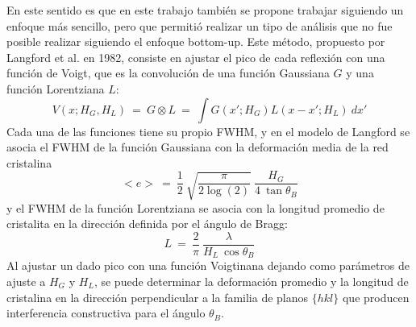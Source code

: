 En este sentido es que en este trabajo también se propone trabajar siguiendo un enfoque más sencillo, pero que permitió realizar un tipo de análisis que no fue posible realizar siguiendo el enfoque bottom-up.
Este método, propuesto por Langford et al. en 1982\cite{DeKeijser1982}, consiste en ajustar el pico de cada reflexión con una función de Voigt, que es la convolución de una función Gaussiana $G$ y una función Lorentziana $L$:
\begin{equation}
  V(x; H_{G}, H_{L}) \ = \ G \otimes L \ = \ \int G(x'; H_{G}) L(x - x'; H_{L}) \ dx'
  \label{eq:Voigt}
\end{equation}
\noindent
Cada una de las funciones tiene su propio FWHM, y en el modelo de Langford se asocia el FWHM de la función Gaussiana con la deformación media de la red cristalina
\begin{equation}
  <e> \ = \ \frac{1}{2} \ \sqrt{\frac{\pi}{2\log(2)}} \ \frac{H_{G}}{4 \ \tan{\theta_B}}
  \label{eq:Gauss}
\end{equation}
\noindent
y el FWHM de la función Lorentziana se asocia con la longitud promedio de cristalita en la dirección definida por el ángulo de Bragg:
\begin{equation}
  L \ = \ \frac{2}{\pi} \ \frac{\lambda}{H_{L} \ \cos{\theta_B}}
  \label{eq:Lorentz}
\end{equation}
\noindent
Al ajustar un dado pico con una función Voigtinana dejando como parámetros de ajuste a $H_G$ y $H_L$, se puede determinar la deformación promedio y la longitud de  cristalina en la dirección perpendicular a la familia de planos $\{hkl\}$ que producen interferencia constructiva para el ángulo $\theta_B$.


